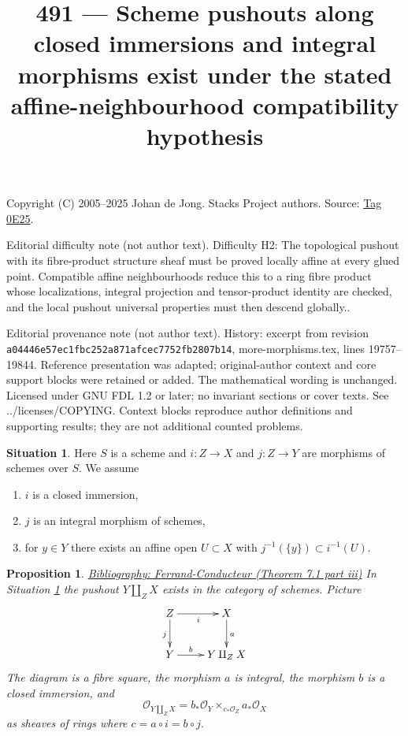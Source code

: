 \documentclass{amsart}
\newenvironment{reference}{\comment}{\endcomment}
\theoremstyle{plain}
\newtheorem{proposition}[subsection]{Proposition}
\theoremstyle{definition}
\newtheorem{situation}[subsection]{Situation}
\theoremstyle{remark}
\numberwithin{equation}{subsection}
\begin{document}
\title[Stacks Project, Tag 0E25]{491 --- Scheme pushouts along closed immersions and integral morphisms exist under the stated affine-neighbourhood compatibility hypothesis}
\maketitle
\noindent Copyright (C) 2005--2025 Johan de Jong. Stacks Project authors. Source: \href{https://stacks.math.columbia.edu/tag/0E25}{Tag 0E25}.

\noindent Editorial difficulty note (not author text). Difficulty H2: The topological pushout with its fibre-product structure sheaf must be proved locally affine at every glued point. Compatible affine neighbourhoods reduce this to a ring fibre product whose localizations, integral projection and tensor-product identity are checked, and the local pushout universal properties must then descend globally..

\noindent Editorial provenance note (not author text). History: excerpt from revision \texttt{a0444\allowbreak 6e57e\allowbreak c1fbc\allowbreak 252a8\allowbreak 71afc\allowbreak ec775\allowbreak 2fb28\allowbreak 07b14}, more-morphisms.tex, lines 19757--19844. Reference presentation was adapted; original-author context and core support blocks were retained or added. The mathematical wording is unchanged. Licensed under GNU FDL 1.2 or later; no invariant sections or cover texts. See ../licenses/COPYING. Context blocks reproduce author definitions and supporting results; they are not additional counted problems.

\begin{situation}
\label{situation-pushout-along-closed-immersion-and-integral}
Here $S$ is a scheme and $i : Z \to X$ and $j : Z \to Y$
are morphisms of schemes over $S$. We assume
\begin{enumerate}
\item $i$ is a closed immersion,
\item $j$ is an integral morphism of schemes,
\item for $y \in Y$ there exists an affine open $U \subset X$
with $j^{-1}(\{y\}) \subset i^{-1}(U)$.
\end{enumerate}
\end{situation}

\begin{proposition}
\label{proposition-pushout-along-closed-immersion-and-integral}
\begin{reference}
\href{https://stacks.math.columbia.edu/bibliography}{Bibliography: Ferrand-Conducteur (Theorem 7.1 part iii)}
\end{reference}
In Situation \ref{situation-pushout-along-closed-immersion-and-integral}
the pushout $Y \amalg_Z X$ exists in the category of schemes. Picture
$$
\xymatrix{
Z \ar[r]_i \ar[d]_j & X \ar[d]^a \\
Y \ar[r]^-b & Y \amalg_Z X
}
$$
The diagram is a fibre square, the morphism $a$ is integral,
the morphism $b$ is a closed immersion, and
$$
\mathcal{O}_{Y \amalg_Z X} =
b_*\mathcal{O}_Y \times_{c_*\mathcal{O}_Z} a_*\mathcal{O}_X
$$
as sheaves of rings where $c = a \circ i = b \circ j$.
\end{proposition}
\end{document}
